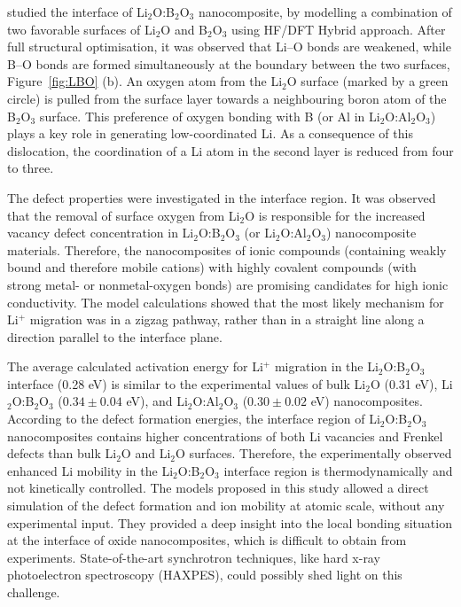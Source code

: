\documentclass[../main.tex]{subfiles}
\begin{document}
\citeauthor{Rana-PRL-2007} studied the interface of Li$_2$O:B$_2$O$_3$ nanocomposite, by modelling a combination of two favorable surfaces of Li$_2$O and B$_2$O$_3$ using HF/DFT Hybrid approach.\cite{Rana-PRL-2007,Rana-JPCM-2012} After full structural optimisation, it was observed that Li--O bonds are weakened, while B--O bonds are formed simultaneously at the boundary between the two surfaces, Figure~\ref{fig:LBO} (b). An oxygen atom from the Li$_2$O surface (marked by a green circle) is pulled from the surface layer towards a neighbouring boron atom of the B$_2$O$_3$ surface. This preference of oxygen bonding with B (or Al in Li$_2$O:Al$_2$O$_3$) plays a key role in generating low-coordinated Li. As a consequence of this dislocation, the coordination of a Li atom in the second layer is reduced from four to three.

The defect properties were investigated in the interface region. It was observed that the removal of surface oxygen from Li$_2$O is responsible for the increased vacancy defect concentration in Li$_2$O:B$_2$O$_3$ (or Li$_2$O:Al$_2$O$_3$) nanocomposite materials. Therefore, the nanocomposites of ionic compounds (containing weakly bound and therefore mobile cations) with highly covalent compounds (with strong metal- or nonmetal-oxygen bonds) are promising candidates for high ionic conductivity. The model calculations showed that the most likely mechanism for Li$^+$ migration was in a zigzag pathway, rather than in a straight line along a direction parallel to the interface plane.

The average calculated activation energy for Li$^+$ migration in the Li$_2$O:B$_2$O$_3$ interface (0.28 eV)\cite{Rana-PRL-2007,Rana-JPCM-2012} is similar to the experimental values of bulk Li$_2$O (0.31 eV),\cite{Heitjans_2003} Li$_2$O:B$_2$O$_3$ ($0.34 \pm 0.04$ eV),\cite {Indris2002} and Li$_2$O:Al$_2$O$_3$ ($0.30 \pm 0.02$ eV)\cite{B300908D} nanocomposites. According to the defect formation energies, the interface region of Li$_2$O:B$_2$O$_3$ nanocomposites contains higher concentrations of both Li vacancies and Frenkel defects than bulk Li$_2$O and Li$_2$O surfaces.\cite{Rana-PRL-2007,Rana-JPCM-2012} Therefore, the experimentally observed enhanced Li mobility in the Li$_2$O:B$_2$O$_3$ interface region is thermodynamically and not kinetically controlled. The models proposed in this study allowed a direct simulation of the defect formation and ion mobility at atomic scale, without any experimental input. They provided a deep insight into the local bonding situation at the interface of oxide nanocomposites, which is difficult to obtain from experiments. State-of-the-art synchrotron techniques, like hard x-ray photoelectron spectroscopy (HAXPES), could possibly shed light on this challenge. \cite{Baggio2021,Claessen2009}
\end{document}
